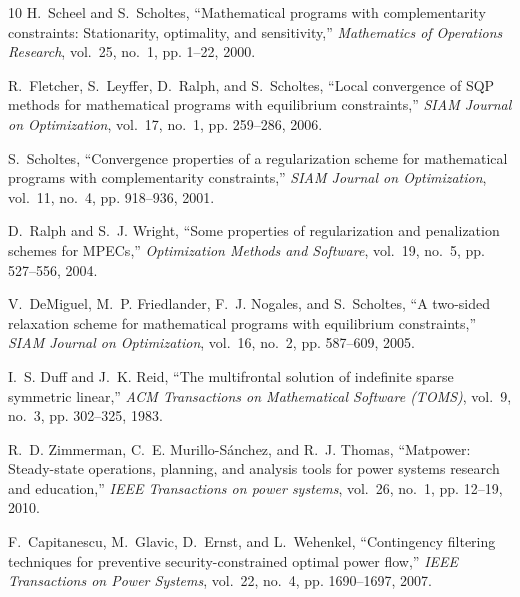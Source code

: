 \documentclass{IEEEtran4PSCC}
\begin{document}
\begin{thebibliography}{10}
H.~Scheel and S.~Scholtes, ``Mathematical programs with complementarity constraints: Stationarity, optimality, and sensitivity,'' \emph{Mathematics of Operations Research}, vol.~25, no.~1, pp. 1--22, 2000.

R.~Fletcher, S.~Leyffer, D.~Ralph, and S.~Scholtes, ``Local convergence of {SQP} methods for mathematical programs with equilibrium constraints,'' \emph{SIAM Journal on Optimization}, vol.~17, no.~1, pp. 259--286, 2006.

S.~Scholtes, ``Convergence properties of a regularization scheme for mathematical programs with complementarity constraints,'' \emph{SIAM Journal on Optimization}, vol.~11, no.~4, pp. 918--936, 2001.

D.~Ralph and S.~J. Wright, ``Some properties of regularization and penalization schemes for {MPECs},'' \emph{Optimization Methods and Software}, vol.~19, no.~5, pp. 527--556, 2004.

V.~DeMiguel, M.~P. Friedlander, F.~J. Nogales, and S.~Scholtes, ``A two-sided relaxation scheme for mathematical programs with equilibrium constraints,'' \emph{SIAM Journal on Optimization}, vol.~16, no.~2, pp. 587--609, 2005.

I.~S. Duff and J.~K. Reid, ``The multifrontal solution of indefinite sparse symmetric linear,'' \emph{ACM Transactions on Mathematical Software (TOMS)}, vol.~9, no.~3, pp. 302--325, 1983.

R.~D. Zimmerman, C.~E. Murillo-S{\'a}nchez, and R.~J. Thomas, ``Matpower: Steady-state operations, planning, and analysis tools for power systems research and education,'' \emph{IEEE Transactions on power systems}, vol.~26, no.~1, pp. 12--19, 2010.

F.~Capitanescu, M.~Glavic, D.~Ernst, and L.~Wehenkel, ``Contingency filtering techniques for preventive security-constrained optimal power flow,'' \emph{IEEE Transactions on Power Systems}, vol.~22, no.~4, pp. 1690--1697, 2007.

\end{thebibliography}



\end{document}
